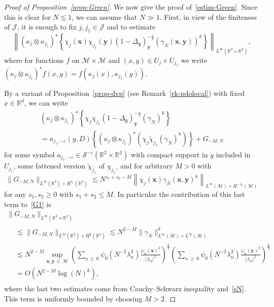 \documentclass[AHL,Unicode,longabstracts,published]{cedram}
\newcommand{\R}{\mathbb{R}}
\newcommand{\x}{\mathbf{x}}
\newcommand{\y}{\mathbf{y}}
\renewcommand{\S}{\mathcal{S}}
\newcommand{\J}{\mathcal{J}}
\newcommand{\M}{\mathcal{M}}
\newcommand{\g}{\mathfrak{g}}
\newcommand{\ld}{\lambda}
\newcommand{\Dlg}{\Delta_{\g}}
\newcommand{\eps}{\varepsilon}
\newcommand{\kk}{\kappa}
\newcommand{\les}{\lesssim}
\newcommand{\jb}[1] {\langle #1 \rangle}
\begin{document}
\begin{proof}[Proof of Proposition~\ref{prop-Green}]
We now give the proof of~\eqref{estim-Green}. Since this is clear for $N\les 1$, we can assume that $N\gg 1$. First, in view of the finiteness of $\J$, it is enough to fix $j,j_1\in \J$ and to estimate
\begin{equation}\label{G1}
\left\|\left(\kk_{j}\otimes\kk_{j_1}\right)^{\star}\left\{\chi_{j}(\x)\chi_{j_1}(\y)(1-\Dlg)_{\y}^{-\frac\eps2}(\gamma_N(\x,\y))^k\right\}\right\|_{L^{\infty}\left(\R^2\times\R^2\right)},
\end{equation}
where for functions $f$ on $\M\times\M$ and $(x,y)\in U_j\times U_{j_1}$ we write $(\kk_{j}\otimes\kk_{j_1})^\star f(x,y) = f(\kk_j(x),\kk_{j_1}(y))$.

By a variant of Proposition~\ref{prop-dvp} (see Remark~\ref{rk-pdolocal}) with fixed $x\in\R^d$, we can write
\begin{multline*}
\left(\kk_{j}\otimes\kk_{j_1}\right)^{\star}\left\{\chi_{j}\chi_{j_1}(1-\Dlg)_{\y}^{-\frac\eps2}(\gamma_N)^k\right\}\\
= a_{j_1,-\eps}(y,D)
\left\{\left(\kk_{j}\otimes\kk_{j_1}\right)^{\star}\left(\chi_{j}\widetilde{\chi}_{j_1}(\gamma_N)^k\right)\right\} + G_{-M,N}
\end{multline*}
for some symbol $a_{j_1,-\eps}\in \S^{-\eps}(\R^2\times\R^2)$ with compact support in $y$ included in $U_{j_1}$, some fattened version $\widetilde{\chi}_{j_1}$ of $\chi_{j_1}$, and for arbitrary $M>0$ with
\begin{equation*}
\big\|G_{-M,N}\big\|_{L^{\infty}(\R^2)\times H^{s_1}(\R^2)} \les N^{s_1+s_2-M}\left\|\chi_j(\x)\gamma_N(\x,\y)^k\right\|_{L^{\infty}(\M)\times H^{-s_2}(\M)}
\end{equation*}
for any $s_1,s_2\ge 0$ with $s_1+s_2\le M$. In particular the contribution of this last term to~\eqref{G1} is
\begin{multline*}
\big\|G_{-M,N}\big\|_{L^{\infty}\left(\R^2\times\R^2\right)}\\
\begin{aligned}
&\les \big\|G_{-M,N}\big\|_{L^{\infty}(\R^2)\times H^2(\R^2)} \les N^{2-M}\big\|\gamma_N\big\|_{L^{\infty}(\M)\times L^{\infty}(\M)}^k\\
& \les N^{2-M}\sup_{\x,\y\,\in\,\M}\left(\sum_{n\,\ge\,0}\psi_0\left(N^{-2}\ld_n^2\right)\frac{\varphi_n(\x)^2}{\jb{\ld_n}^2}\right)^{\frac{k}2}\left(\sum_{n\,\ge\,0}\psi_0\left(N^{-2}\ld_n^2\right)\frac{\varphi_n(\y)^2}{\jb{\ld_n}^2}\right)^{\frac{k}2}\\
& = O\left(N^{2-M}\log(N)^k\right),
\end{aligned}
\end{multline*}
where the last two estimates come from Cauchy--Schwarz inequality and~\eqref{sN}. This term is uniformly bounded by choosing $M>2$.


\end{proof}
\end{document}
